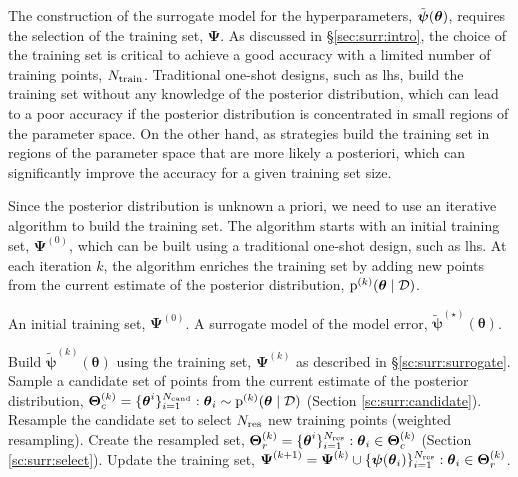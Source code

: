 The construction of the surrogate model for the hyperparameters, $\tilde{\boldsymbol{\psi}}(\boldsymbol{\theta})$, requires the selection of the training set, $\boldsymbol{\Psi}$. As discussed in \S\ref{sec:surr:intro}, the choice of the training set is critical to achieve a good accuracy with a limited number of training points, $N_{\mathrm{train}}$. Traditional one-shot designs, such as \gls{lhs}, build the training set without any knowledge of the posterior distribution, which can lead to a poor accuracy if the posterior distribution is concentrated in small regions of the parameter space. On the other hand, \gls{as} strategies build the training set in regions of the parameter space that are more likely a posteriori, which can significantly improve the accuracy for a given training set size.

\smallskip
Since the posterior distribution is unknown a priori, we need to use an iterative algorithm to build the training set. The algorithm starts with an initial training set, $\boldsymbol{\Psi}^{(0)}$, which can be built using a traditional one-shot design, such as \gls{lhs}. At each iteration $k$, the algorithm enriches the training set by adding new points from the current estimate of the posterior distribution, $\mathrm{p}^{(k)}(\boldsymbol{\theta} \mid \mathcal{D})$. 

\begin{algorithm}[htbp]
    \small %
    \begin{algorithmic}[1]
      \Require An initial training set, $\boldsymbol{\Psi}^{(0)}$.
      \Ensure A surrogate model of the model error, $\tilde{\boldsymbol{\psi}}^{(\star)}(\boldsymbol{\theta})$.
  
        \State Build $\tilde{\boldsymbol{\psi}}^{(k)}(\boldsymbol{\theta})$ using the training set, $\boldsymbol{\Psi}^{(k)}$ as described in \S\ref{sc:surr:surrogate}.
        \State Sample a candidate set of points from the current estimate of the posterior distribution, $\boldsymbol{\Theta}_c^{(k)} = \{\boldsymbol{\theta}^i\}_{i=1}^{N_{\mathrm{cand}}} : \boldsymbol{\theta}_i \sim \mathrm{p}^{(k)}(\boldsymbol{\theta} \mid \mathcal{D})$ (Section \ref{sc:surr:candidate}).
        \State Resample the candidate set to select ${N_{\mathrm{res}}}$ new training points (weighted resampling). Create the resampled set, $\boldsymbol{\Theta}_r^{(k)} = \{\boldsymbol{\theta}^i\}_{i=1}^{N_{\mathrm{res}}} : \boldsymbol{\theta}_i \in \boldsymbol{\Theta}_c^{(k)}$ (Section \ref{sc:surr:select}).
        \State Update the training set, $\boldsymbol{\Psi}^{(k+1)} = \boldsymbol{\Psi}^{(k)} \cup \{\boldsymbol{\psi}(\boldsymbol{\theta}_i)\}_{i=1}^{N_{\mathrm{res}}} : \boldsymbol{\theta}_i \in \boldsymbol{\Theta}_r^{(k)}$.
      \EndWhile
    \end{algorithmic}
    \caption{Adaptive construction of the surrogate of the model error.}
    \label{alg:adapt_surr}
\end{algorithm}

